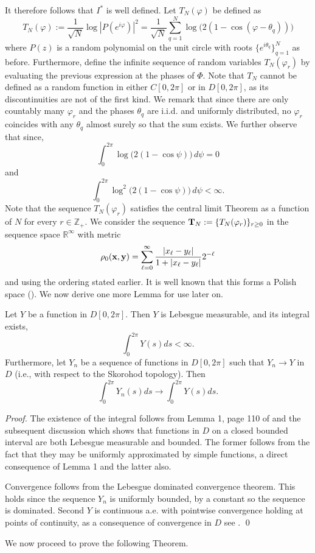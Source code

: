 \documentclass[smallextended]{svjour3}
\begin{document}
It therefore follows that $I^*$ is well defined. Let $T_{N}(\varphi)$ be defined as 
\begin{equation}
T_{N}(\varphi) := \frac{1}{\sqrt{N}}\log|P(e^{i\varphi})|^2 =  \frac{1}{\sqrt{N}} \sum_{q=1}^N \log \Big(2(1 - \cos(\varphi-\theta_q))\Big)
\label{eqn_TNdefn}
\end{equation}
where $P(z)$ is a random polynomial on the unit circle with roots $\{e^{i\theta_{q}}\}_{q=1}^{N}$ as before. Furthermore, define the infinite sequence of random variables $T_N(\varphi_r)$ by evaluating the previous expression at the phases of $\Phi$. Note that $T_N$ cannot be defined as a random function in either $C[0,2\pi]$ or in $D[0,2\pi]$, as its discontinuities are not of the first kind. We remark that since there are only countably many $\varphi_r$ and the phases $\theta_q$ are i.i.d. and uniformly distributed, no $\varphi_r$ coincides with any $\theta_q$ almost surely so that the sum exists.  We further observe that since, 
$$
\int_0^{2 \pi}{\log \big(2(1 - \cos\psi)\big)\,d\psi} = 0
$$
and 
$$
\int_0^{2\pi}{\log^2\big(2(1 - \cos\psi)\big)\,d\psi} < \infty.
$$
Note that the sequence $T_N(\varphi_r)$ satisfies the central limit Theorem as a function of $N$ for every $r \in {{\mathbb Z}_+}$. We consider the sequence ${\bf T}_N:=\{T_N(\varphi_r)\}_{r\geq 0}$ in the sequence space ${\mathbb R}^\infty$ with metric
$$
\rho_0({\bf x}, {\bf y}) = \sum_{\ell=0}^\infty \frac{ {{\ensuremath{\lvert{{{x_\ell - y_\ell}}}\rvert}}}}{1 +  {{\ensuremath{\lvert{{{x_\ell - y_\ell}}}\rvert}}}} 2^{-\ell}
$$
and using the ordering stated earlier. It is well known that this forms a Polish space (\cite{Billingsley68}). We now derive one more Lemma for use later on.
\begin{lemma}
\label{lem_Dctsmap}
Let $Y$ be a function in $D[0,2\pi]$. Then $Y$ is Lebesgue measurable, and its integral exists,
\begin{equation}
\int_0^{2\pi} Y(s) ds < \infty.
\end{equation}
Furthermore, let $Y_n$ be a sequence of functions in $D[0,2\pi]$ such that 
$Y_n \rightarrow Y$ in $D$ (i.e., with respect to the Skorohod topology). Then
\begin{equation}
\int_0^{2\pi} Y_n(s) ds \rightarrow \int_0^{2\pi} Y(s)ds.
\end{equation}
\end{lemma}

\begin{proof}
The existence of the integral follows from Lemma 1, page 110 of \cite{Billingsley68} and the subsequent discussion
which shows that functions in $D$ on a closed bounded interval are both Lebesgue measurable and bounded.
The former follows from the fact that they may be uniformly approximated by simple functions, a direct
consequence of Lemma 1 and the latter also. 

Convergence follows from the Lebesgue dominated convergence theorem.
This holds since the sequence $Y_n$ is uniformly bounded, by a constant so the sequence is dominated.
Second $Y$ is continuous a.e. with pointwise convergence holding at points of continuity, as a consequence
of convergence in $D$ see \cite{Billingsley68}.
\qed \end{proof}
We now proceed to prove the following Theorem.
\end{document}
